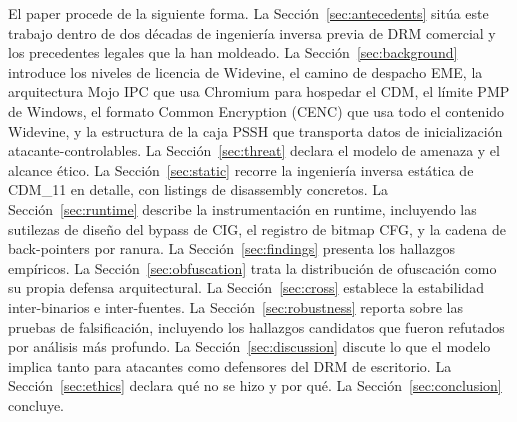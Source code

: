 \documentclass[11pt,letterpaper]{article}
\begin{document}
El paper procede de la siguiente forma. La
Sección~\ref{sec:antecedents} sitúa este trabajo dentro de dos
décadas de ingeniería inversa previa de DRM comercial y los
precedentes legales que la han moldeado.
La Sección~\ref{sec:background} introduce los niveles de licencia
de Widevine, el camino de despacho EME, la arquitectura Mojo IPC
que usa Chromium para hospedar el CDM, el límite PMP de Windows,
el formato Common Encryption (CENC) que usa todo el contenido
Widevine, y la estructura de la caja PSSH que transporta datos
de inicialización atacante-controlables.
La Sección~\ref{sec:threat} declara el modelo de amenaza y el
alcance ético.
La Sección~\ref{sec:static} recorre la ingeniería inversa estática
de CDM\_11 en detalle, con listings de disassembly concretos.
La Sección~\ref{sec:runtime} describe la instrumentación en
runtime, incluyendo las sutilezas de diseño del bypass de CIG, el
registro de bitmap CFG, y la cadena de back-pointers por ranura.
La Sección~\ref{sec:findings} presenta los hallazgos empíricos.
La Sección~\ref{sec:obfuscation} trata la distribución de
ofuscación como su propia defensa arquitectural.
La Sección~\ref{sec:cross} establece la estabilidad
inter-binarios e inter-fuentes.
La Sección~\ref{sec:robustness} reporta sobre las pruebas de
falsificación, incluyendo los hallazgos candidatos que fueron
refutados por análisis más profundo.
La Sección~\ref{sec:discussion} discute lo que el modelo implica
tanto para atacantes como defensores del DRM de escritorio.
La Sección~\ref{sec:ethics} declara qué no se hizo y por qué.
La Sección~\ref{sec:conclusion} concluye.
\end{document}
